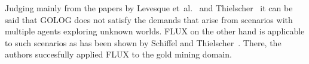 Judging mainly from the papers by Levesque et~al.~\cite{levesque_golog:_1997} and Thielscher~\cite{thielscher_flux:_2005} it can be said that GOLOG does not satisfy the demands that arise from scenarios with multiple agents exploring unknown worlds. FLUX on the other hand is applicable to such scenarios as has been shown by Schiffel and Thielscher~\cite{schiffel_multi-agent_2007}. There, the authors succesfully applied FLUX to the gold mining domain.
